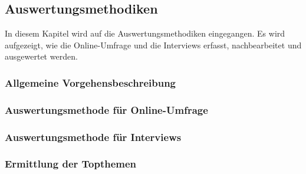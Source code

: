 \documentclass[../../main.tex]{subfiles}
\begin{document}
\subsection{Auswertungsmethodiken}

\begin{sloppypar}
In diesem Kapitel wird auf die Auswertungsmethodiken eingegangen. Es wird aufgezeigt, wie die Online-Umfrage und die Interviews erfasst, nachbearbeitet und ausgewertet werden.
\end{sloppypar}

\subsubsection{Allgemeine Vorgehensbeschreibung}
\label{allgemeine_vorgehensbeschreibung}



\subsubsection{Auswertungsmethode für Online-Umfrage}
\label{auswertung_online}



\newpage
\subsubsection{Auswertungsmethode für Interviews}
\label{auswertung_interview}



\subsubsection{Ermittlung der Topthemen}
\label{ermittlung_topthemen}

\end{document}

